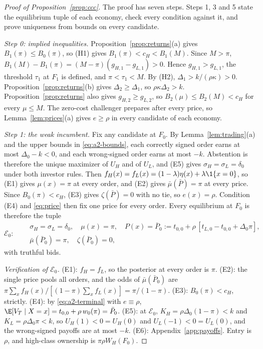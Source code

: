 \begin{proof}[Proof of Proposition~\ref{prop:ccc}]
The proof has seven steps. Steps 1, 3 and 5 state the equilibrium tuple of each economy, check every condition
against it, and prove uniqueness from bounds on every candidate.

\emph{Step 0: implied inequalities.} Proposition~\ref{prop:returns}(a) gives \(B_1(\pi)\le B_0(\pi)\), so (H1)
gives \(B_1(\pi)<c_H<B_1(M)\). Since \(M>\pi\), \(B_1(M)-B_1(\pi)=(M-\pi)(g_{H,1}-g_{L,1})>0\). Hence
\(g_{H,1}>g_{L,1}\), the threshold \(\tau_1\) at \(F_1\) is defined, and \(\pi<\tau_1<M\). By (H2),
\(\Delta_1>k/(\rho\kappa)>0\). Proposition~\ref{prop:returns}(b) gives \(\Delta_2\ge\Delta_1\), so
\(\rho\kappa\Delta_2>k\). Proposition~\ref{prop:returns} also gives \(g_{H,2}\ge g_{L,2}\), so
\(B_2(\mu)\le B_2(M)<c_H\) for every \(\mu\le M\). The zero-cost challenger prepares after every price, so
Lemma~\ref{lem:prices}(a) gives \(e\ge\rho\) in every candidate of each economy.

\emph{Step 1: the weak incumbent.} Fix any candidate at \(F_0\). By Lemma~\ref{lem:trading}(a) and the upper bounds
in \eqref{eq:a2-bounds}, each correctly signed order earns at most \(\Delta_0-k<0\), and each wrong-signed order
earns at most \(-k\). Abstention is therefore the unique maximizer of \(U_H\) and of \(U_L\), and (E5) gives
\(\sigma_H=\sigma_L=\delta_0\) under both investor rules. Then \(f_H(x)=f_L(x)=(1-\lambda)\eta(x)+\lambda\1\{x=0\}\),
so (E1) gives \(\mu(x)=\pi\) at every order, and (E2) gives \(\bar\mu(\bar P)=\pi\) at every price. Since
\(B_0(\pi)<c_H\), (E3) gives \(\zeta(\bar P)=0\) with no tie, so \(e(x)=\rho\). Condition (E4) and
\eqref{eq:price} then fix one price for every order. Every equilibrium at \(F_0\) is therefore the tuple
\[
\mathcal E_0:\quad
\begin{aligned}
&\sigma_H=\sigma_L=\delta_0,\quad \mu(x)=\pi,\quad P(x)=\bar P_0:=t_{0,0}+\rho\,[t_{L,0}-t_{0,0}+\Delta_0\pi],\\
&\bar\mu(\bar P_0)=\pi,\quad \zeta(\bar P_0)=0,
\end{aligned}
\]
with truthful bids.

\emph{Verification of \(\mathcal E_0\).} (E1): \(f_H=f_L\), so the posterior at every order is \(\pi\). (E2): the
single price pools all orders, and the odds of \(\bar\mu(\bar P_0)\) are
\(\pi\sum_xf_H(x)/[(1-\pi)\sum_xf_L(x)]=\pi/(1-\pi)\). (E3): \(B_0(\pi)<c_H\), strictly. (E4): by
\eqref{eq:a2-terminal} with \(e\equiv\rho\), \(\E[V_T\mid X=x]=t_{0,0}+\rho\,w_0(\pi)=\bar P_0\). (E5): at
\(\mathcal E_0\), \(K_H=\rho\Delta_0(1-\pi)<k\) and \(K_L=\rho\Delta_0\pi<k\), so \(U_H(1)<0=U_H(0)\) and
\(U_L(-1)<0=U_L(0)\), and the wrong-signed payoffs are at most \(-k\). (E6): Appendix~\ref{app:payoffs}. Entry is
\(\rho\), and high-class ownership is \(\pi\rho W_H(F_0)\).


\end{proof}
